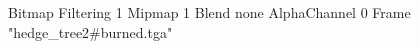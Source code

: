 {Bitmap
	{Filtering 1}
	{Mipmap 1}
	{Blend none}
	{AlphaChannel 0}
	{Frame "hedge_tree2#burned.tga"}
}
